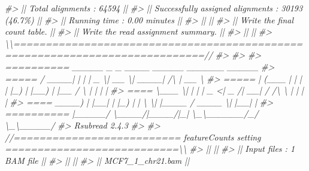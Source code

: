 \documentclass[
]{article}
\newenvironment{Shaded}{\begin{snugshade}}{\end{snugshade}}
\newcommand{\CommentTok}[1]{\textcolor[rgb]{0.56,0.35,0.01}{\textit{#1}}}
\begin{document}
\begin{Shaded}
\begin{Highlighting}[]
\CommentTok{\#\textgreater{} ||    Total alignments : 64594                                                ||}
\CommentTok{\#\textgreater{} ||    Successfully assigned alignments : 30193 (46.7\%)                        ||}
\CommentTok{\#\textgreater{} ||    Running time : 0.00 minutes                                             ||}
\CommentTok{\#\textgreater{} ||                                                                            ||}
\CommentTok{\#\textgreater{} || Write the final count table.                                               ||}
\CommentTok{\#\textgreater{} || Write the read assignment summary.                                         ||}
\CommentTok{\#\textgreater{} ||                                                                            ||}
\CommentTok{\#\textgreater{} \textbackslash{}\textbackslash{}============================================================================//}
\CommentTok{\#\textgreater{} }
\CommentTok{\#\textgreater{} }
\CommentTok{\#\textgreater{}         ==========     \_\_\_\_\_ \_    \_ \_\_\_\_  \_\_\_\_\_  \_\_\_\_\_\_          \_\_\_\_\_  }
\CommentTok{\#\textgreater{}         =====         / \_\_\_\_| |  | |  \_ \textbackslash{}|  \_\_ \textbackslash{}|  \_\_\_\_|   /\textbackslash{}   |  \_\_ \textbackslash{} }
\CommentTok{\#\textgreater{}           =====      | (\_\_\_ | |  | | |\_) | |\_\_) | |\_\_     /  \textbackslash{}  | |  | |}
\CommentTok{\#\textgreater{}             ====      \textbackslash{}\_\_\_ \textbackslash{}| |  | |  \_ \textless{}|  \_  /|  \_\_|   / /\textbackslash{} \textbackslash{} | |  | |}
\CommentTok{\#\textgreater{}               ====    \_\_\_\_) | |\_\_| | |\_) | | \textbackslash{} \textbackslash{}| |\_\_\_\_ / \_\_\_\_ \textbackslash{}| |\_\_| |}
\CommentTok{\#\textgreater{}         ==========   |\_\_\_\_\_/ \textbackslash{}\_\_\_\_/|\_\_\_\_/|\_|  \textbackslash{}\_\textbackslash{}\_\_\_\_\_\_/\_/    \textbackslash{}\_\textbackslash{}\_\_\_\_\_/}
\CommentTok{\#\textgreater{}        Rsubread 2.4.3}
\CommentTok{\#\textgreater{} }
\CommentTok{\#\textgreater{} //========================== featureCounts setting ===========================\textbackslash{}\textbackslash{}}
\CommentTok{\#\textgreater{} ||                                                                            ||}
\CommentTok{\#\textgreater{} ||             Input files : 1 BAM file                                       ||}
\CommentTok{\#\textgreater{} ||                                                                            ||}
\CommentTok{\#\textgreater{} ||                           MCF7\_1\_chr21.bam                                 ||}

\end{Highlighting}
\end{Shaded}
\end{document}
